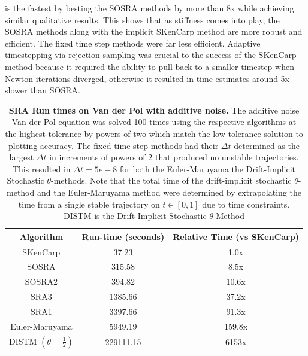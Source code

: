 \documentclass{article}
\begin{document}
is the fastest by besting the SOSRA methods by more than 8x while
achieving similar qualitative results. This shows that as stiffness
comes into play, the SOSRA methods along with the implicit SKenCarp
method are more robust and efficient. The fixed time step methods
were far less efficient. Adaptive timestepping via rejection sampling
was crucial to the success of the SKenCarp method because it required
the ability to pull back to a smaller timestep when Newton iterations
diverged, otherwise it resulted in time estimates around 5x slower
than SOSRA.
\begin{center}
	\begin{table}
		\begin{centering}
			\begin{tabular}{|c|c|c|}
				\hline
				Algorithm & Run-time (seconds) & Relative Time (vs SKenCarp)\tabularnewline
				\hline
				\hline
				SKenCarp & 37.23 & 1.0x\tabularnewline
				\hline
				SOSRA & 315.58 & 8.5x\tabularnewline
				\hline
				SOSRA2 & 394.82 & 10.6x\tabularnewline
				\hline
				SRA3 & 1385.66 & 37.2x\tabularnewline
				\hline
				SRA1 & 3397.66 & 91.3x\tabularnewline
				\hline
				Euler-Maruyama & 5949.19 & 159.8x\tabularnewline
				\hline
				DISTM $\left(\theta=\frac{1}{2}\right)$ & 229111.15 & 6153x\tabularnewline
				\hline
			\end{tabular}
			\par\end{centering}
		\caption{\textbf{SRA Run times on Van der Pol with additive noise.} The additive
			noise Van der Pol equation was solved 100 times using the respective
			algorithms at the highest tolerance by powers of two which match the
			low tolerance solution to plotting accuracy. The fixed time step methods
			had their $\Delta t$ determined as the largest $\Delta t$ in increments
			of powers of 2 that produced no unstable trajectories. This resulted
			in $\Delta t=5e-8$ for both the Euler-Maruyama the Drift-Implicit
			Stochastic $\theta$-methods. Note that the total time of the drift-implicit
			stochastic $\theta$-method and the Euler-Maruyama method were determined
			by extrapolating the time from a single stable trajectory on $t\in[0,1]$
			due to time constraints. DISTM is the Drift-Implicit Stochastic
			$\theta$-Method\label{tab:SRA-Runtimes-on-Van}}
	\end{table}
	\par\end{center}
\end{document}
